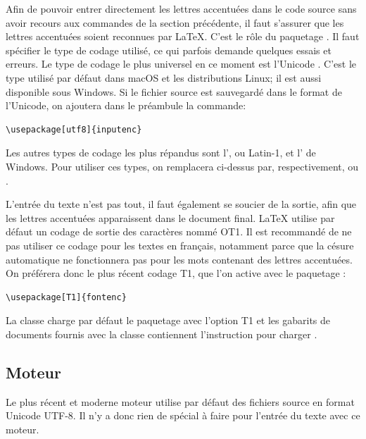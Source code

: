 Afin de pouvoir entrer directement les lettres accentuées dans le code
source sans avoir recours aux commandes de la section précédente, il
faut s'assurer que les lettres accentuées soient reconnues par
{\LaTeX}. C'est le rôle du paquetage  \citep{inputenc}.
Il faut spécifier le type de codage utilisé, ce qui parfois demande
quelques essais et erreurs. Le type de codage le plus universel en ce
moment est l'Unicode \citep{Unicode:5.0}. C'est le type utilisé par
défaut dans macOS et les distributions Linux; il est aussi
disponible sous Windows. Si le fichier source est sauvegardé dans le
format %
de l'Unicode, on ajoutera dans le préambule la commande:
\begin{lstlisting}
\usepackage[utf8]{inputenc}
\end{lstlisting}

Les autres types de codage les plus répandus sont
l', ou
Latin-1, et l'
de Windows. Pour utiliser ces types, on remplacera 
ci-dessus par, respectivement,  ou .

L'entrée du texte n'est pas tout, il faut également se soucier de la
sortie, afin que les lettres accentuées apparaissent dans le document
final. {\LaTeX} utilise par défaut un codage de sortie des caractères
nommé OT1. Il est recommandé de ne pas utiliser ce codage pour les
textes en français, notamment parce que la césure automatique ne
fonctionnera pas pour les mots contenant des lettres accentuées. On
préférera donc le plus récent codage T1, que l'on active avec le
paquetage  \citep{fontenc}:
\begin{lstlisting}
\usepackage[T1]{fontenc}
\end{lstlisting}

La classe  charge par défaut le paquetage 
avec l'option T1 et les gabarits de documents fournis avec la classe
contiennent l'instruction pour charger .

\subsection{Moteur \XeTeX}
\label{sec:bases:francais:xetex}

Le plus récent et moderne moteur {\XeTeX} utilise par défaut des
fichiers source en format Unicode UTF-8. Il n'y a donc rien de spécial
à faire pour l'entrée du texte avec ce moteur.

